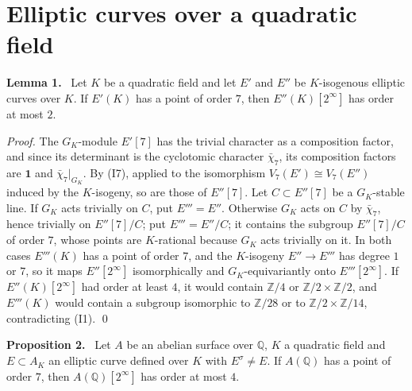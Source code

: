 \documentclass[11pt]{article}
\newenvironment{statement}[1]{\par\medskip\noindent\phantomsection\textbf{#1}\ }{\par\medskip}
\newcommand{\Q}{\mathbb Q}
\newcommand{\Z}{\mathbb Z}
\begin{document}
\section{Elliptic curves over a quadratic field}\label{quadratic}

\begin{statement}{Lemma 1.}\label{lemma-km}
Let \(K\) be a quadratic field and let \(E'\) and \(E''\) be \(K\)-isogenous elliptic curves over
\(K\). If \(E'(K)\) has a point of order \(7\), then \(E''(K)[2^\infty]\) has order at most \(2\).
\end{statement}

\emph{Proof.} The \(G_K\)-module \(E'[7]\) has the trivial character as a composition factor, and
since its determinant is the cyclotomic character \(\bar\chi_7\), its composition factors are
\(\mathbf 1\) and \(\bar\chi_7|_{G_K}\). By (I7), applied to the isomorphism \(V_7(E')\cong V_7(E'')\) induced by the \(K\)-isogeny, so
are those of \(E''[7]\). Let
\(C\subset E''[7]\) be a \(G_K\)-stable line. If \(G_K\) acts trivially on \(C\), put
\(E'''=E''\). Otherwise \(G_K\) acts on \(C\) by \(\bar\chi_7\), hence trivially on
\(E''[7]/C\); put \(E'''=E''/C\); it contains the subgroup \(E''[7]/C\) of order \(7\), whose points
are \(K\)-rational because \(G_K\) acts trivially on it. In both cases \(E'''(K)\) has a point of order \(7\), and the \(K\)-isogeny
\(E''\to E'''\) has degree \(1\) or \(7\), so it maps \(E''[2^\infty]\) isomorphically and
\(G_K\)-equivariantly onto \(E'''[2^\infty]\). If \(E''(K)[2^\infty]\) had order at least \(4\), it
would contain \(\Z/4\) or \(\Z/2\times\Z/2\), and \(E'''(K)\) would contain a subgroup isomorphic to
\(\Z/28\) or to \(\Z/2\times\Z/14\), contradicting (I1). \qed

\begin{statement}{Proposition 2.}\label{prop-quadratic}
Let \(A\) be an abelian surface over \(\Q\), \(K\) a quadratic field and \(E\subset A_K\) an
elliptic curve defined over \(K\) with \(E^\sigma\neq E\). If \(A(\Q)\) has a point of order
\(7\), then \(A(\Q)[2^\infty]\) has order at most \(4\).
\end{statement}
\end{document}
